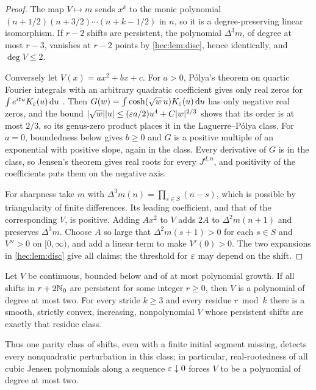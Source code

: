 \begin{proof}
The map $V\mapsto m$ sends $x^k$ to the monic polynomial $(n+1/2)(n+3/2)\cdots(n+k-1/2)$ in $n$, so it is
a degree-preserving linear isomorphism. If $r-2$ shifts are persistent, the polynomial $\Delta^3m$, of
degree at most $r-3$, vanishes at $r-2$ points by \cref{hec:lem:disc}, hence identically, and
$\deg V\le2$.

Conversely let $V(x)=ax^2+bx+c$. For $a>0$, P\'olya's theorem on quartic Fourier integrals with an
arbitrary quadratic coefficient gives only real zeros for $\int e^{itu}K_\varepsilon(u)\,\mathrm{d} u$
\cite[(1.3)]{deBruijn1950Roots}. Then $G(w)=\int\cosh(\sqrt w\,u)K_\varepsilon(u)\,\mathrm{d} u$ has only negative real
zeros, and the bound $\lvert\sqrt w\rvert\lvert u\rvert\le(\varepsilon a/2)u^4+C\lvert w\rvert^{2/3}$ shows that its order is at most
$2/3$, so its genus-zero product places it in the Laguerre--P\'olya class. For $a=0$, boundedness below
gives $b\ge0$ and $G$ is a positive multiple of an exponential with positive slope, again in the class.
Every derivative of $G$ is in the class, so Jensen's theorem gives real roots for every $J^{d,n}$, and
positivity of the coefficients puts them on the negative axis.

For sharpness take $m$ with $\Delta^3m(n)=\prod_{s\in S}(n-s)$, which is possible by triangularity of
finite differences. Its leading coefficient, and that of the corresponding $V$, is positive. Adding $Ax^2$
to $V$ adds $2A$ to $\Delta^2m(n+1)$ and preserves $\Delta^3m$. Choose $A$ so large that
$\Delta^2m(s+1)>0$ for each $s\in S$ and $V''>0$ on $[0,\infty)$, and add a linear term to make $V'(0)>0$.
The two expansions in \cref{hec:lem:disc} give all claims; the threshold for $\varepsilon$ may depend on the
shift.
\end{proof}

\begin{theorem}\label{hec:thm:stride}
Let $V$ be continuous, bounded below and of at most polynomial growth. If all shifts in $r+2\mathbb{N}_0$ are
persistent for some integer $r\ge0$, then $V$ is a polynomial of degree at most two. For every stride
$k\ge3$ and every residue $r\bmod k$ there is a smooth, strictly convex, increasing, nonpolynomial $V$
whose persistent shifts are exactly that residue class.
\end{theorem}

Thus one parity class of shifts, even with a finite initial segment missing, detects every nonquadratic
perturbation in this class; in particular, real-rootedness of all cubic Jensen polynomials along a sequence
$\varepsilon\downarrow0$ forces $V$ to be a polynomial of degree at most two.

